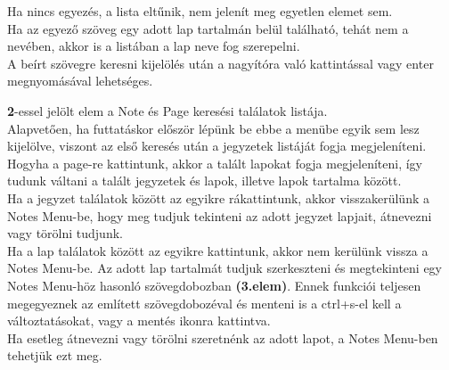 \vspace{5pt} \noindent Ha nincs egyezés, a lista eltűnik, nem jelenít meg egyetlen elemet sem.
\vspace{5pt} \\Ha az egyező szöveg egy adott lap tartalmán belül található, tehát nem a nevében, akkor is a listában a lap neve fog szerepelni.
\vspace{5pt} \\A beírt szövegre keresni kijelölés után a nagyítóra való kattintással vagy enter megnyomásával lehetséges.
	
	
\vspace{10pt} \noindent \textbf{2}-essel jelölt elem a Note és Page keresési találatok listája.
\vspace{5pt} \\Alapvetően, ha futtatáskor először lépünk be ebbe a menübe egyik sem lesz kijelölve, viszont az első keresés után a jegyzetek listáját fogja megjeleníteni. Hogyha a page-re kattintunk, akkor a talált lapokat fogja megjeleníteni, így tudunk váltani a talált jegyzetek és lapok, illetve lapok tartalma között.
\vspace{5pt} \\Ha a jegyzet találatok között az egyikre rákattintunk, akkor visszakerülünk a Notes Menu-be, hogy meg tudjuk tekinteni az adott jegyzet lapjait, átnevezni vagy törölni tudjunk.
\vspace{5pt} \\Ha a lap találatok között az egyikre kattintunk, akkor nem kerülünk vissza a Notes Menu-be. Az adott lap tartalmát tudjuk szerkeszteni és megtekinteni egy Notes Menu-höz hasonló szövegdobozban \textbf{(3.elem)}. Ennek funkciói teljesen megegyeznek az említett szövegdobozéval és menteni is a ctrl+s-el kell a változtatásokat, vagy a mentés ikonra kattintva.
\vspace{5pt} \\Ha esetleg átnevezni vagy törölni szeretnénk az adott lapot, a Notes Menu-ben tehetjük ezt meg.

